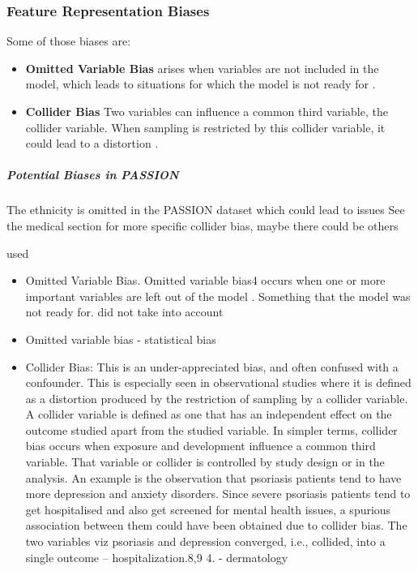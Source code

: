 \documentclass[12pt, a4paper, oneside]{book}   	%
\renewcommand{\paragraph}[1]{%
	\subsubsection*{#1}%
}
\newif\ifrawcitationactive
\newcommand{\rawcitationstart}{
	\color{purple}\rawcitationactivetrue
}
\newcommand{\rawcitationend}{
	\color{black}\rawcitationactivefalse
}
\newcommand{\rawcitationusedstart}{\color{violet}}
\newcommand{\rawcitationusedend}{%
	\ifrawcitationactive
	\color{purple}  %
	\else
	\color{black}  %
	\fi
}
\begin{document}
			\paragraph{Feature Representation Biases}
			
			Some of those biases are:
			\begin{itemize}
				\item \textbf{Omitted Variable Bias} arises when variables are not included in the model, which leads to situations for which the model is not ready for \autocites{Mehrabi_2021}{Mester_2022}\autocites{M38_Clarke_2005}{M131_Riegg_2008}\autocite{M114_Mustard_2003}.
				\item \textbf{Collider Bias} Two variables can influence a common third variable, the collider variable. When sampling is restricted by this collider variable, it could lead to a distortion  \autocite{Chakraborty_2024, c4,c8,c9}.
			\end{itemize}
			
			
			\subparagraph{Potential Biases in PASSION}
			The ethnicity is omitted in the PASSION dataset which could lead to issues
			See the medical section for more specific collider bias, maybe there could be others
			
			\rawcitationstart
			used
			\begin{itemize}
				\rawcitationusedstart
				\item Omitted Variable Bias. Omitted variable bias4 occurs when one or more important variables are left out of the model \autocites{M38_Clarke_2005}{M131_Riegg_2008}\autocite{M114_Mustard_2003}. Something that the model was not ready for\autocite{Mehrabi_2021}. did not take into account \autocite{Mehrabi_2021}
				\item Omitted variable bias \autocites{Mester_2022}{Mester_2017} - statistical bias
				\item Collider Bias: This is an under-appreciated bias, and often confused with a confounder. This is especially seen in observational studies where it is defined as a distortion produced by the restriction of sampling by a collider variable. A collider variable is defined as one that has an independent effect on the outcome studied apart from the studied variable. In simpler terms, collider bias occurs when exposure and development influence a common third variable. That variable or collider is controlled by study design or in the analysis. An example is the observation that psoriasis patients tend to have more depression and anxiety disorders. Since severe psoriasis patients tend to get hospitalised and also get screened for mental health issues, a spurious association between them could have been obtained due to collider bias. The two variables viz psoriasis and depression converged, i.e., collided, into a single outcome – hospitalization.8,9 4. \autocite{Chakraborty_2024} - dermatology
				\rawcitationusedend
			\end{itemize}
			\rawcitationend
			
\end{document}
